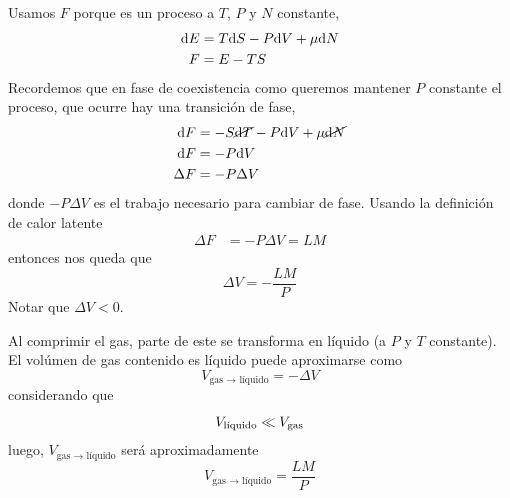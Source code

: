 \begin{sol}
Usamos $F$ porque es un proceso a $T$, $P$ y $N$ constante,
	\begin{align}
  \dd E&=T\dd S-P\dd V+\mu \dd N\\
  F&=E-TS
\end{align}
Recordemos que en fase de coexistencia como queremos mantener $P$ constante el proceso, que ocurre hay una transición de fase,
\begin{align}
  \dd F&=-S\cancel{\dd T }-P\dd V+\mu \cancel{\dd N}\\
  \dd F&=-P\dd V\\
  \Delta F&=-P\Delta V
\end{align}
donde $-P\Delta V$ es el trabajo necesario para cambiar de fase. Usando la definición de calor latente
\begin{align}
  \Delta F&=-P\Delta V=LM
\end{align}
entonces nos queda que
\begin{equation}
  \Delta V=-\frac{LM}{P}
\end{equation}
Notar que $\Delta V<0$.

Al comprimir el gas, parte de este se transforma en líquido (a $P$ y $T$ constante). El volúmen de gas contenido es líquido puede aproximarse como
\begin{equation}
  V_{\text{gas $\to$ líquido}}=-\Delta V
\end{equation}
considerando que
\begin{equation}
  V_{\text{líquido}}\ll V_{\rm gas}
\end{equation}
luego, $V_{\text{gas $\to$ líquido}}$ será aproximadamente
\begin{equation}
\boxed{  V_{\text{gas $\to$ líquido}}=\frac{LM}{P}}
\end{equation}
\end{sol}

